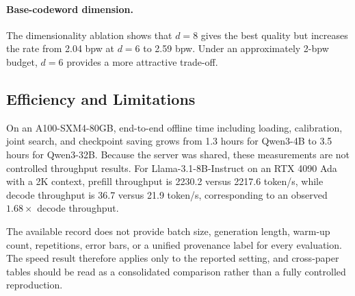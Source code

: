 \paragraph{Base-codeword dimension.} The dimensionality ablation shows that $d=8$ gives the best quality but increases the rate from 2.04 bpw at $d=6$ to 2.59 bpw. Under an approximately 2-bpw budget, $d=6$ provides a more attractive trade-off.


\subsection{Efficiency and Limitations}

On an A100-SXM4-80GB, end-to-end offline time including loading, calibration, joint search, and checkpoint saving grows from 1.3 hours for Qwen3-4B to 3.5 hours for Qwen3-32B. Because the server was shared, these measurements are not controlled throughput results.
For Llama-3.1-8B-Instruct on an RTX 4090 Ada with a 2K context, prefill throughput is 2230.2 versus 2217.6 token/s, while decode throughput is 36.7 versus 21.9 token/s, corresponding to an observed $1.68\times$ decode throughput.


The available record does not provide batch size, generation length, warm-up count, repetitions, error bars, or a unified provenance label for every evaluation. The speed result therefore applies only to the reported setting, and cross-paper tables should be read as a consolidated comparison rather than a fully controlled reproduction.
